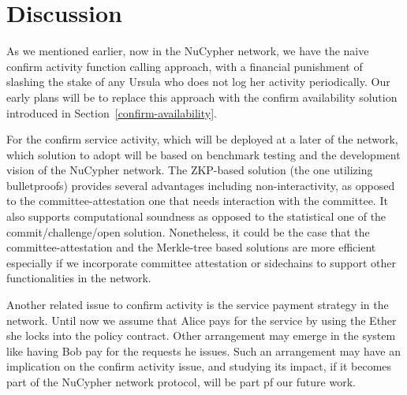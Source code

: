 \section{Discussion}
\label{discussion}
As we mentioned earlier, now in the NuCypher network, we have the naive confirm activity function calling approach, with a financial punishment of slashing the stake of any Ursula who does not log her activity periodically. Our early plans will be to replace this approach with the confirm availability solution introduced in Section~\ref{confirm-availability}.


For the confirm service activity, which will be deployed at a later of the network, which solution to adopt will be based on benchmark testing and the development vision of the NuCypher network. The ZKP-based solution (the one utilizing bulletproofs) provides several advantages including non-interactivity, as opposed to the committee-attestation one that needs interaction with the committee. It also supports computational soundness as opposed to the statistical one of the commit/challenge/open solution. Nonetheless, it could be the case that the committee-attestation and the Merkle-tree based solutions are more efficient especially if we incorporate committee attestation or sidechains to support other functionalities in the network. 


Another related issue to confirm activity is the service payment strategy in the network. Until now we assume that Alice pays for the service by using the Ether she locks into the policy contract. Other arrangement may emerge in the system like having Bob pay for the requests he issues. Such an arrangement may have an implication on the confirm activity issue, and studying its impact, if it becomes part of the NuCypher network protocol, will be part pf our future work.
